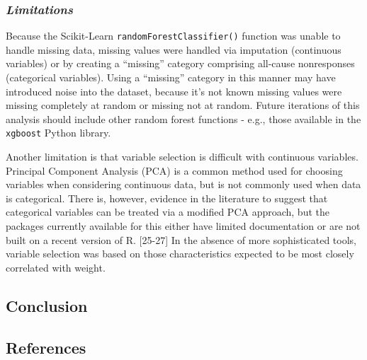 \documentclass[]{article}
\begin{document}
\hypertarget{limitations}{%
\subsubsection{\texorpdfstring{\emph{Limitations}}{Limitations}}\label{limitations}}

Because the Scikit-Learn \texttt{randomForestClassifier()} function was
unable to handle missing data, missing values were handled via
imputation (continuous variables) or by creating a ``missing'' category
comprising all-cause nonresponses (categorical variables). Using a
``missing'' category in this manner may have introduced noise into the
dataset, because it's not known missing values were missing completely
at random or missing not at random. Future iterations of this analysis
should include other random forest functions - e.g., those available in
the \texttt{xgboost} Python library.

Another limitation is that variable selection is difficult with
continuous variables. Principal Component Analysis (PCA) is a common
method used for choosing variables when considering continuous data, but
is not commonly used when data is categorical. There is, however,
evidence in the literature to suggest that categorical variables can be
treated via a modified PCA approach, but the packages currently
available for this either have limited documentation or are not built on
a recent version of R. {[}25-27{]} In the absence of more sophisticated
tools, variable selection was based on those characteristics expected to
be most closely correlated with weight.

\hypertarget{conclusion}{%
\subsection{\texorpdfstring{\textbf{Conclusion}}{Conclusion}}\label{conclusion}}

\hypertarget{references}{%
\subsection{\texorpdfstring{\textbf{References}}{References}}\label{references}}
\end{document}
